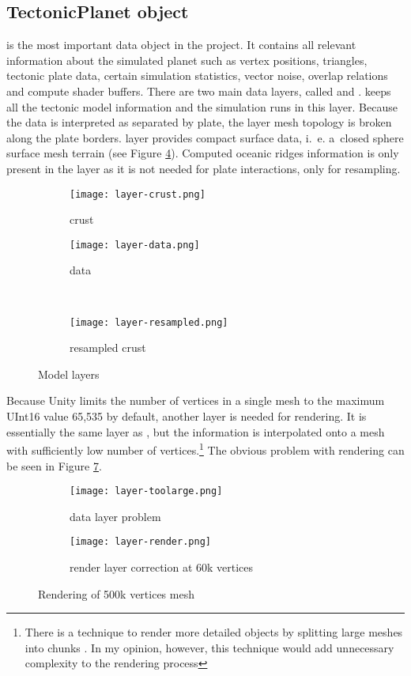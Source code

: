 \subsection{TectonicPlanet object}
 is the most important data object in the project. It contains all relevant information about the simulated planet such as vertex positions, triangles, tectonic plate data, certain simulation statistics, vector noise, overlap relations and compute shader buffers. There are two main data layers, called  and .  keeps all the tectonic model information and the simulation runs in this layer.  Because the data is interpreted as separated by plate, the layer mesh topology is broken along the plate borders.  layer provides compact surface data, i.~e. a~closed sphere surface mesh terrain (see Figure \ref{fig:model-layers}). Computed oceanic ridges information is only present in the  layer as it is not needed for plate interactions, only for resampling.
\begin{figure}[ht]
\centering
\begin{subfigure}{7cm}
\texttt{[image: layer-crust.png]}
\caption{crust}
\label{fig:layer-crust}
\end{subfigure}
\hspace*{1cm}
\begin{subfigure}{7cm}
\texttt{[image: layer-data.png]}
\caption{data}
\label{fig:layer-data}
\end{subfigure}\\
\begin{subfigure}{7cm}
\texttt{[image: layer-resampled.png]}
\caption{resampled crust}
\label{fig:layer-resampled}
\end{subfigure}
\caption{Model layers}
\label{fig:model-layers}
\end{figure}

Because Unity limits the number of vertices in a single mesh to the maximum UInt16 value 65,535 by default, another  layer is needed for rendering. It is essentially the same layer as , but the information is interpolated onto a mesh with sufficiently low number of vertices.\footnote{There is a technique to render more detailed objects by splitting large meshes into chunks \cite{chunks}. In my opinion, however, this technique would add unnecessary complexity to the rendering process} The obvious problem with rendering can be seen in Figure \ref{fig:render-500k}.
\begin{figure}[ht]
\centering
\begin{subfigure}{7cm}
\texttt{[image: layer-toolarge.png]}
\caption{data layer problem}
\label{fig:layer-toolarge}
\end{subfigure}
\hspace*{1cm}
\begin{subfigure}{7cm}
\texttt{[image: layer-render.png]}
\caption{render layer correction at 60k vertices}
\label{fig:layer-render}
\end{subfigure}
\caption{Rendering of 500k vertices mesh}
\label{fig:render-500k}
\end{figure}

